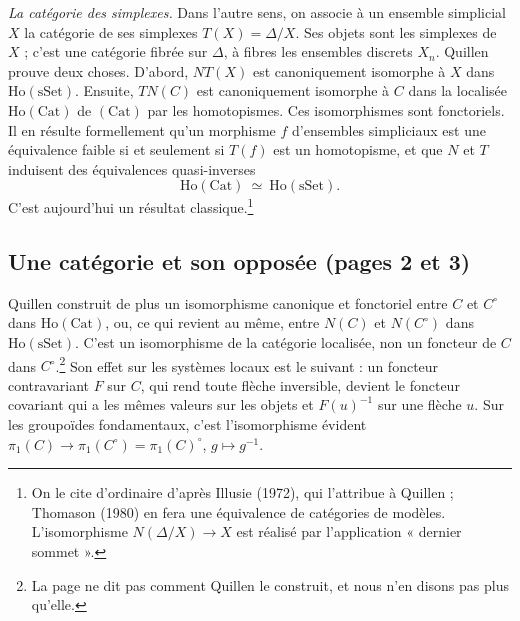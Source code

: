 \documentclass[11pt,a4paper]{article}
\begin{document}
\emph{La catégorie des simplexes.} Dans l'autre sens, on associe à un ensemble
simplicial $X$ la catégorie de ses simplexes $T(X) = \Delta/X$. Ses objets sont
les simplexes de $X$ ; c'est une catégorie fibrée sur $\Delta$, à fibres les
ensembles discrets $X_n$. Quillen prouve deux choses. D'abord, $N T(X)$ est
canoniquement isomorphe à $X$ dans $\mathrm{Ho}(\mathrm{sSet})$. Ensuite,
$T N(C)$ est canoniquement isomorphe à $C$ dans la localisée
$\mathrm{Ho}(\mathrm{Cat})$ de $(\mathrm{Cat})$ par les homotopismes. Ces
isomorphismes sont fonctoriels. Il en résulte formellement qu'un morphisme $f$
d'ensembles simpliciaux est une équivalence faible si et seulement si $T(f)$
est un homotopisme, et que $N$ et $T$ induisent des équivalences
quasi-inverses
\[
\mathrm{Ho}(\mathrm{Cat}) \ \simeq\ \mathrm{Ho}(\mathrm{sSet}).
\]
C'est aujourd'hui un résultat classique.\footnote{On le cite d'ordinaire
d'après Illusie (1972), qui l'attribue à Quillen ; Thomason (1980) en fera une
équivalence de catégories de modèles. L'isomorphisme $N(\Delta/X) \to X$ est
réalisé par l'application « dernier sommet ».}

\subsection*{Une catégorie et son opposée (pages 2 et 3)}

Quillen construit de plus un isomorphisme canonique et fonctoriel entre $C$ et
$C^{\circ}$ dans $\mathrm{Ho}(\mathrm{Cat})$, ou, ce qui revient au même,
entre $N(C)$ et $N(C^{\circ})$ dans $\mathrm{Ho}(\mathrm{sSet})$. C'est un
isomorphisme de la catégorie localisée, non un foncteur de $C$ dans
$C^{\circ}$.\footnote{La page ne dit pas comment Quillen le construit, et nous
n'en disons pas plus qu'elle.} Son effet sur les systèmes locaux est le
suivant : un foncteur contravariant $F$ sur $C$, qui rend toute flèche
inversible, devient le foncteur covariant qui a les mêmes valeurs sur les
objets et $F(u)^{-1}$ sur une flèche $u$. Sur les groupoïdes fondamentaux,
c'est l'isomorphisme évident $\pi_1(C) \to \pi_1(C^{\circ}) =
\pi_1(C)^{\circ}$, $g \mapsto g^{-1}$.
\end{document}

